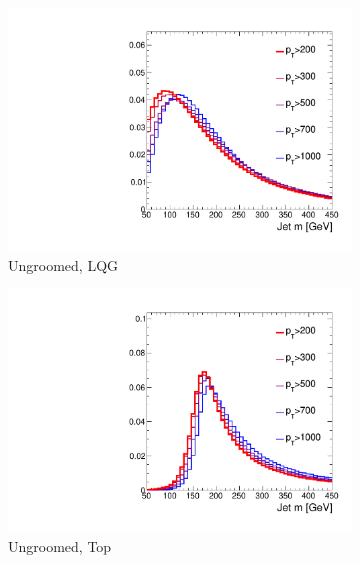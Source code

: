 \begin{figure}[]
    \begin{center}
        \begin{subfigure}[t]{0.35\textwidth}
            \includegraphics[width=\textwidth]{figures/toptagging/gen/norm_clf_M_QCD.pdf}
            \caption{Ungroomed, LQG}
        \end{subfigure}
        \begin{subfigure}[t]{0.35\textwidth}
            \includegraphics[width=\textwidth]{figures/toptagging/gen/norm_clf_M_ZpTT_lo.pdf}
            \caption{Ungroomed, Top}
        \end{subfigure}
        \begin{subfigure}[t]{0.35\textwidth}

\end{subfigure}
\end{center}
\end{figure}
